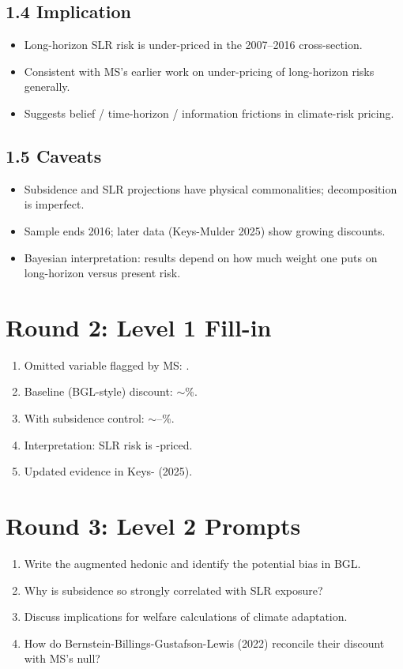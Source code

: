 \documentclass[11pt]{article}
\newcommand{\blank}[1]{\underline{\hspace{#1}}}
\begin{document}
\subsection*{1.4 Implication}
\begin{itemize}
\item Long-horizon SLR risk is under-priced in the 2007--2016 cross-section.
\item Consistent with MS's earlier work on under-pricing of long-horizon risks generally.
\item Suggests belief / time-horizon / information frictions in climate-risk pricing.
\end{itemize}

\subsection*{1.5 Caveats}
\begin{alertbox}
\begin{itemize}
\item Subsidence and SLR projections have physical commonalities; decomposition is imperfect.
\item Sample ends 2016; later data (Keys-Mulder 2025) show growing discounts.
\item Bayesian interpretation: results depend on how much weight one puts on long-horizon versus present risk.
\end{itemize}
\end{alertbox}

\section*{Round 2: Level 1 Fill-in}
\begin{enumerate}
\item Omitted variable flagged by MS: \blank{2cm}.
\item Baseline (BGL-style) discount: $\sim$\blank{1cm}\%.
\item With subsidence control: $\sim$\blank{1cm}--\blank{1cm}\%.
\item Interpretation: SLR risk is \blank{1cm}-priced.
\item Updated evidence in Keys-\blank{1.5cm} (2025).
\end{enumerate}

\section*{Round 3: Level 2 Prompts}
\begin{enumerate}
\item Write the augmented hedonic and identify the potential bias in BGL.
\item Why is subsidence so strongly correlated with SLR exposure?
\item Discuss implications for welfare calculations of climate adaptation.
\item How do Bernstein-Billings-Gustafson-Lewis (2022) reconcile their discount with MS's null?
\end{enumerate}
\end{document}
